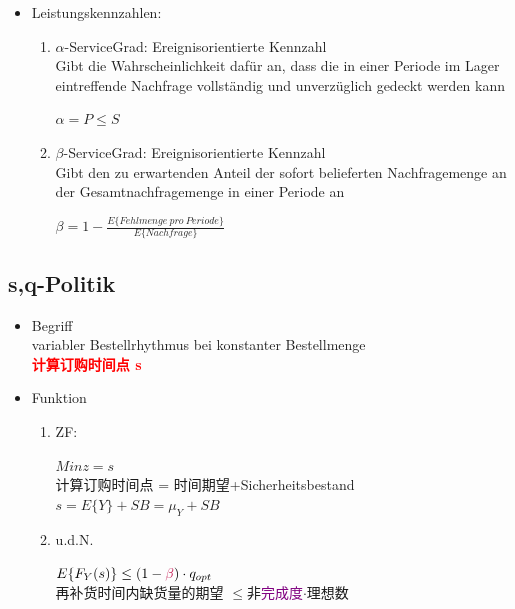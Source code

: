 \documentclass[12pt, letterpaper]{article}
\begin{document}
\begin{CJK*}{UTF8}{gbsn}
\begin{itemize}

\item Leistungskennzahlen:
\begin{enumerate}

\item $\alpha$-ServiceGrad: Ereignisorientierte Kennzahl\\
Gibt die Wahrscheinlichkeit dafür an, dass die in einer Periode im Lager eintreffende Nachfrage vollständig und unverzüglich gedeckt werden kann

\begin{center}
$\alpha=P\leq S$
\end{center}

\item $\beta$-ServiceGrad: Ereignisorientierte Kennzahl\\
Gibt den zu erwartenden Anteil der sofort belieferten Nachfragemenge an der Gesamtnachfragemenge in einer Periode an
\begin{center}
$\beta=1- \frac{E\{Fehlmenge\ pro\ Periode\}}{E\{Nachfrage\}}$
\end{center}


\end{enumerate}


\end{itemize}


\newpage
\subsection{s,q-Politik}

\begin{itemize}
\item Begriff\\
variabler Bestellrhythmus bei konstanter Bestellmenge\\
\textcolor{red}{\textbf{计算订购时间点 s}}

\item Funktion

\begin{enumerate}

\item ZF:
\begin{center}
$Min z = s$\\
计算订购时间点 = 时间期望+Sicherheitsbestand\\
$s=E\{Y\}+SB=\mu_Y + SB$ \\
\end{center}

\item u.d.N.\\
\begin{center}
$E\{F_Y(s)\} \leq (1-\textcolor{purple}{\beta}) \cdot q_{opt}$\\
再补货时间内缺货量的期望 $\leq$非\textcolor{purple}{完成度}$\cdot$理想数
\end{center}



\end{enumerate}
\end{itemize}
\end{CJK*}
\end{document}
